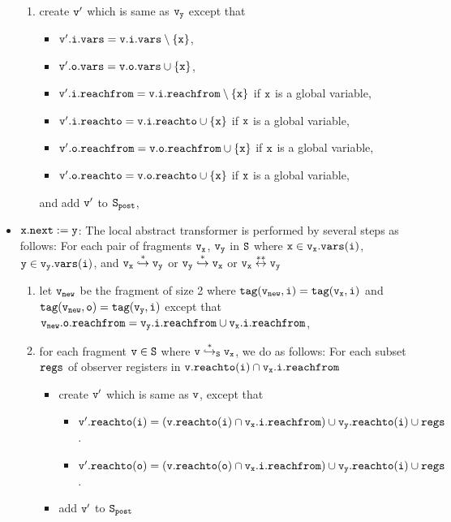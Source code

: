 \begin{itemize}
\begin{enumerate}
\item create $\tt v'$ which is same as $\tt v_y$ except that
\begin{itemize}
\item $\tt v'.i.vars = v.i.vars \setminus \{x\}$,
\item $\tt v'.o.vars = v.o.vars \cup \{x\}$,
\item $\tt v'.i.reachfrom = v.i.reachfrom \setminus \{x\}$ if $\tt x$ is a global variable,
\item $\tt v'.i.reachto = v.i.reachto \cup \{x\}$ if $\tt x$ is a global variable,
 \item $\tt v'.o.reachfrom = v.o.reachfrom \cup \{x\}$ if $\tt x$ is a global variable,
 \item $\tt v'.o.reachto = v.o.reachto \cup \{x\}$ if $\tt x$ is a global variable,
\end{itemize}
and add $\tt v'$ to $\tt S_{post}$,
%
\end{enumerate}	




\item  ${\tt x.next:= y}$: The local abstract transformer is performed by several steps as follows: For each pair of fragments $\tt v_x$, $\tt v_y$ in $\tt S$ where $\tt x \in v_x.{\tt vars}(\tt i)$, $\tt y \in v_y.{\tt vars}(\tt i)$, and $\tt v_x \overset{*}\hookrightarrow v_y$ or $\tt v_y \overset{*}\hookrightarrow v_x$ or $\tt v_x \overset{**}\leftrightarrow v_y$
\begin{enumerate}
\item let $\tt v_{new}$ be the fragment of size 2 where $\tt tag(v_{new},i) = tag(v_x, i)$ and $\tt tag(v_{new},o) = tag(v_y,i)$ except that $\tt v_{new}.o.reachfrom = v_y.i.reachfrom \cup v_x.i.reachfrom$,
\item  for each fragment $\tt v \in S$ where $\tt v \overset{*}\hookrightarrow_S v_x$, we do as follows: For each subset $\tt regs$ of observer registers in $\tt v.reachto(\tt i) \cap \tt v_x.i.reachfrom$
\begin{itemize}
\item create $\tt v'$ which is same as $\tt v$, except that
\begin{itemize}
\item $\tt v'.reachto(\tt i) = (\tt v.reachto(\tt i) \cap v_x.i.reachfrom) \cup v_y.reachto(\tt i) \cup regs$.
\item $\tt v'.reachto(\tt o) = (\tt v.reachto(\tt o) \cap v_x.i.reachfrom) \cup v_y.reachto(\tt i) \cup regs$.
\end{itemize}
\item add $\tt v'$ to $\tt S_{post}$
\end{itemize}


\end{enumerate}
\end{itemize}
